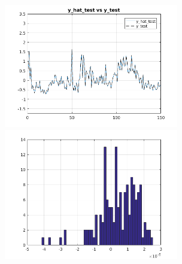 \documentclass[12pt]{article}
\begin{document}
\includegraphics [width=3in]{Lab1Part3_02.png}
\includegraphics [width=3in]{Lab1Part3_04.png}
\end{document}
